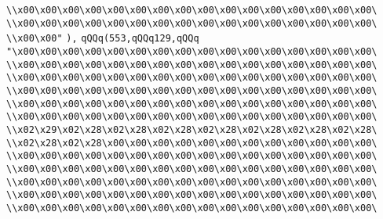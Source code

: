 \verb|\\x00\x00\x00\x00\x00\x00\x00\x00\x00\x00\x00\x00\x00\x00\x00\x00\|\newline
\verb|\\x00\x00\x00\x00\x00\x00\x00\x00\x00\x00\x00\x00\x00\x00\x00\x00\|\newline
\verb|\\x00\x00"|\newline
\verb|),|\newline
\verb|qQQq(553,qQQq129,qQQq|\newline
\verb|"\x00\x00\x00\x00\x00\x00\x00\x00\x00\x00\x00\x00\x00\x00\x00\x00\|\newline
\verb|\\x00\x00\x00\x00\x00\x00\x00\x00\x00\x00\x00\x00\x00\x00\x00\x00\|\newline
\verb|\\x00\x00\x00\x00\x00\x00\x00\x00\x00\x00\x00\x00\x00\x00\x00\x00\|\newline
\verb|\\x00\x00\x00\x00\x00\x00\x00\x00\x00\x00\x00\x00\x00\x00\x00\x00\|\newline
\verb|\\x00\x00\x00\x00\x00\x00\x00\x00\x00\x00\x00\x00\x00\x00\x00\x00\|\newline
\verb|\\x00\x00\x00\x00\x00\x00\x00\x00\x00\x00\x00\x00\x00\x00\x00\x00\|\newline
\verb|\\x02\x29\x02\x28\x02\x28\x02\x28\x02\x28\x02\x28\x02\x28\x02\x28\|\newline
\verb|\\x02\x28\x02\x28\x00\x00\x00\x00\x00\x00\x00\x00\x00\x00\x00\x00\|\newline
\verb|\\x00\x00\x00\x00\x00\x00\x00\x00\x00\x00\x00\x00\x00\x00\x00\x00\|\newline
\verb|\\x00\x00\x00\x00\x00\x00\x00\x00\x00\x00\x00\x00\x00\x00\x00\x00\|\newline
\verb|\\x00\x00\x00\x00\x00\x00\x00\x00\x00\x00\x00\x00\x00\x00\x00\x00\|\newline
\verb|\\x00\x00\x00\x00\x00\x00\x00\x00\x00\x00\x00\x00\x00\x00\x00\x00\|\newline
\verb|\\x00\x00\x00\x00\x00\x00\x00\x00\x00\x00\x00\x00\x00\x00\x00\x00\|\newline
